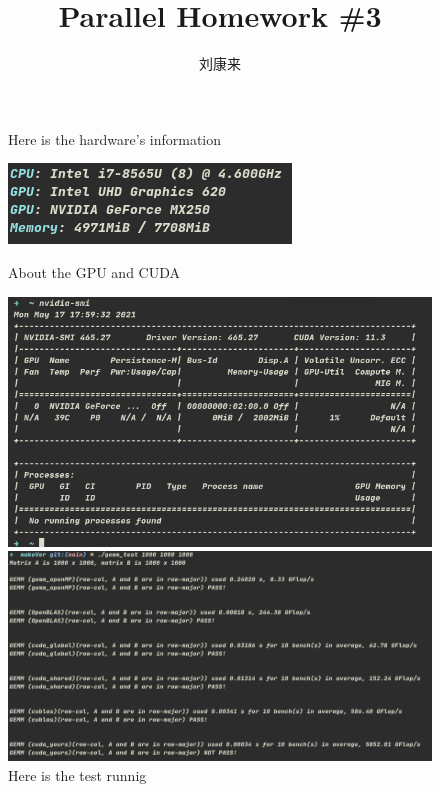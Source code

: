 \documentclass[12pt]{ctexart}
\title{Parallel Homework \#3}
\author{刘康来}
\begin{document}
\maketitle

\newpage

\begin{figure}[h!]
    \centering
    \caption{Here is the hardware's information}
    \includegraphics[scale=0.5]{HardwareInfo}
    \caption{About the GPU and CUDA}
    \includegraphics[scale=0.5]{Gpu}
    \caption{Here is the test runnig}
    \includegraphics[scale=0.5]{testrunning}
\end{figure}

\newpage
\end{document}
